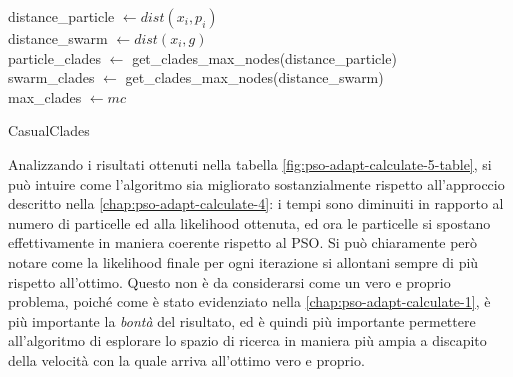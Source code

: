 \begin{algorithm}[!h]
    distance\_particle $\gets dist(x_i, p_i)$ \\
    distance\_swarm $\gets dist(x_i, g)$ \\
    particle\_clades $\gets$ get\_clades\_max\_nodes(distance\_particle)\\
    swarm\_clades $\gets$ get\_clades\_max\_nodes(distance\_swarm) \\
    max\_clades $\gets mc$ \\
     
    \caption{CasualClades}
    \label{algo:pso-adapt-calculate-5-algo}
\end{algorithm}
Analizzando i risultati ottenuti nella tabella \autoref{fig:pso-adapt-calculate-5-table}, si può intuire come l'algoritmo sia migliorato sostanzialmente rispetto all'approccio descritto nella \autoref{chap:pso-adapt-calculate-4}: i tempi sono diminuiti in rapporto al numero di particelle ed alla likelihood ottenuta, ed ora le particelle si spostano effettivamente in maniera coerente rispetto al PSO. Si può chiaramente però notare come la likelihood finale per ogni iterazione si allontani sempre di più rispetto all'ottimo. Questo non è da considerarsi come un vero e proprio problema, poiché come è stato evidenziato nella \autoref{chap:pso-adapt-calculate-1}, è più importante la \textit{bontà} del risultato, ed è quindi più importante permettere all'algoritmo di esplorare lo spazio di ricerca in maniera più ampia a discapito della velocità con la quale arriva all'ottimo vero e proprio.

